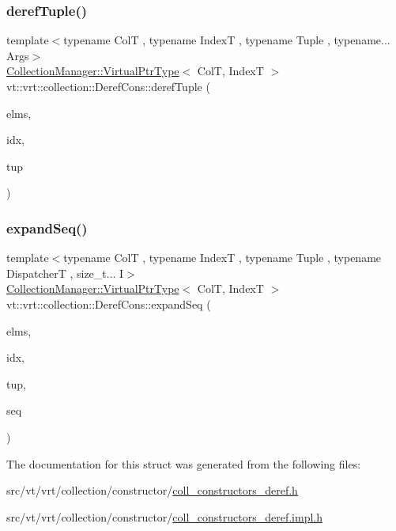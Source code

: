 \subsubsection{\texorpdfstring{deref\+Tuple()}{derefTuple()}}
{\footnotesize\ttfamily template$<$typename ColT , typename IndexT , typename Tuple , typename... Args$>$ \\
\hyperlink{structvt_1_1vrt_1_1collection_1_1_collection_manager_a1da9015e52d6ecca955f57b59aab0b82}{Collection\+Manager\+::\+Virtual\+Ptr\+Type}$<$ ColT, IndexT $>$ vt\+::vrt\+::collection\+::\+Deref\+Cons\+::deref\+Tuple (\begin{DoxyParamCaption}\item[{\hyperlink{namespacevt_ac115668758184050beff7a9281a2c490}{Virtual\+Elm\+Count\+Type} const \&}]{elms,  }\item[{IndexT const \&}]{idx,  }\item[{std\+::tuple$<$ Args... $>$ $\ast$}]{tup }\end{DoxyParamCaption})\hspace{0.3cm}{\ttfamily [static]}}

\mbox{\label{structvt_1_1vrt_1_1collection_1_1_deref_cons_a557c69641faad74bcf17f5cc737fb816}} 
\subsubsection{\texorpdfstring{expand\+Seq()}{expandSeq()}}
{\footnotesize\ttfamily template$<$typename ColT , typename IndexT , typename Tuple , typename DispatcherT , size\+\_\+t... I$>$ \\
\hyperlink{structvt_1_1vrt_1_1collection_1_1_collection_manager_a1da9015e52d6ecca955f57b59aab0b82}{Collection\+Manager\+::\+Virtual\+Ptr\+Type}$<$ ColT, IndexT $>$ vt\+::vrt\+::collection\+::\+Deref\+Cons\+::expand\+Seq (\begin{DoxyParamCaption}\item[{\hyperlink{namespacevt_ac115668758184050beff7a9281a2c490}{Virtual\+Elm\+Count\+Type} const \&}]{elms,  }\item[{IndexT const \&}]{idx,  }\item[{Tuple $\ast$}]{tup,  }\item[{std\+::index\+\_\+sequence$<$ I... $>$}]{seq }\end{DoxyParamCaption})\hspace{0.3cm}{\ttfamily [static]}}



The documentation for this struct was generated from the following files\+:\begin{DoxyCompactItemize}
\item 
src/vt/vrt/collection/constructor/\hyperlink{coll__constructors__deref_8h}{coll\+\_\+constructors\+\_\+deref.\+h}\item 
src/vt/vrt/collection/constructor/\hyperlink{coll__constructors__deref_8impl_8h}{coll\+\_\+constructors\+\_\+deref.\+impl.\+h}\end{DoxyCompactItemize}
